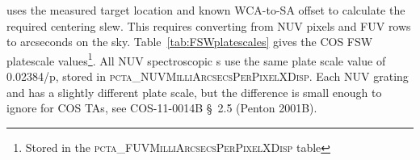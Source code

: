  uses the measured target location and known WCA-to-SA offset to calculate the required centering slew.
This requires converting from NUV pixels and FUV rows to arcseconds on the sky. Table~\ref{tab:FSWplatescales} gives the
COS FSW platescale values\footnote{Stored in the \textsc{pcta\_FUVMilliArcsecsPerPixelXDisp} table}. All NUV spectroscopic
s use the same plate scale value of 0.02384\arcsec{}/p, stored in \textsc{pcta\_NUVMilliArcsecsPerPixelXDisp}.
Each NUV grating and \cenwave{} has a slightly different plate scale, but the difference is small enough to ignore for COS TAs, see COS-11-0014B \S~{2.5} (Penton 2001B).



